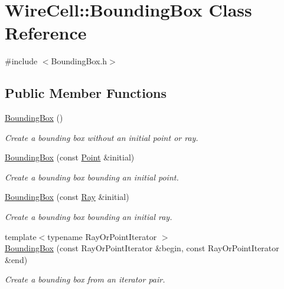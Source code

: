 \hypertarget{class_wire_cell_1_1_bounding_box}{}\section{Wire\+Cell\+:\+:Bounding\+Box Class Reference}
\label{class_wire_cell_1_1_bounding_box}


{\ttfamily \#include $<$Bounding\+Box.\+h$>$}

\subsection*{Public Member Functions}
\begin{DoxyCompactItemize}
\item 
\hyperlink{class_wire_cell_1_1_bounding_box_a7b87ed5ef66808aef4ad0d3c6b23482d}{Bounding\+Box} ()
\begin{DoxyCompactList}\small\item\em Create a bounding box without an initial point or ray. \end{DoxyCompactList}\item 
\hyperlink{class_wire_cell_1_1_bounding_box_a223a5a27ee7198e141c2c7da91292ddc}{Bounding\+Box} (const \hyperlink{namespace_wire_cell_ab2b2565fa6432efbb4513c14c988cda9}{Point} \&initial)
\begin{DoxyCompactList}\small\item\em Create a bounding box bounding an initial point. \end{DoxyCompactList}\item 
\hyperlink{class_wire_cell_1_1_bounding_box_a243f42132a2da67f25125b60491d87ad}{Bounding\+Box} (const \hyperlink{namespace_wire_cell_a3ab20d9b438feb7eb1ffaab9ba98af0c}{Ray} \&initial)
\begin{DoxyCompactList}\small\item\em Create a bounding box bounding an initial ray. \end{DoxyCompactList}\item 
{\footnotesize template$<$typename Ray\+Or\+Point\+Iterator $>$ }\\\hyperlink{class_wire_cell_1_1_bounding_box_ac84d096b79ddd8ea2b4d73c1d324c739}{Bounding\+Box} (const Ray\+Or\+Point\+Iterator \&begin, const Ray\+Or\+Point\+Iterator \&end)
\begin{DoxyCompactList}\small\item\em Create a bounding box from an iterator pair. \end{DoxyCompactList}\item 

\end{DoxyCompactItemize}
